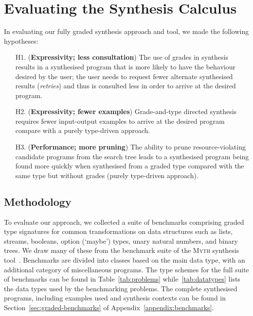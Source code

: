 \section{Evaluating the Synthesis Calculus}
\label{section:graded-base-evaluation}

In evaluating our fully graded synthesis approach and tool, we made the following hypotheses:
\begin{enumerate}
\item[H1.] (\textbf{Expressivity; less consultation}) The use of grades in synthesis results in a synthesised program
  that is more likely to have the behaviour desired by the user; the user needs to request
  fewer alternate synthesised results (\emph{retries}) and thus is consulted less in order to arrive at the desired program. %
\item[H2.] (\textbf{Expressivity; fewer examples}) Grade-and-type directed
  synthesis requires fewer input-output examples to arrive at the desired
  program compare with a purely type-driven approach. %
\item[H3.] (\textbf{Performance; more pruning}) The ability to prune resource-violating candidate programs from the search
        tree leads to a synthesised program being found more quickly when
        synthesised from a graded type compared with
        the same type but without grades (purely type-driven approach).
\end{enumerate}

\subsection{Methodology}
%
To evaluate our approach, we collected a suite of benchmarks comprising graded
type signatures for common transformations on data structures such as lists,
streams, booleans, option (`maybe') types, unary natural numbers, and binary
trees. We draw many of these from the benchmark suite of the \textsc{Myth}
synthesis tool~\citep{oseraMYTH1}.  Benchmarks are divided into classes based on
the main data type, with an additional category of miscellaneous programs. The
type schemes for the full suite of benchmarks can be found in
Table~\ref{tab:problems} while~\ref{tab:datatypes} lists the data types used by the 
benchmarking problems. The complete synthesised programs, including examples
used and synthesis contexts can be found in Section~\ref{sec:graded-benchmarks}
of Appendix~\ref{appendix:benchmarks}. 

